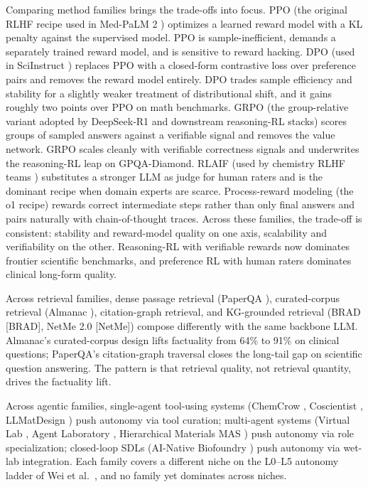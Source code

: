 \documentclass{article}
\begin{document}
Comparing method families brings the trade-offs into focus. PPO (the original RLHF recipe used in Med-PaLM 2 \cite{singhal2025towardexpertlevelm}) optimizes a learned reward model with a KL penalty against the supervised model. PPO is sample-inefficient, demands a separately trained reward model, and is sensitive to reward hacking. DPO (used in SciInstruct \cite{zhang2024sciinstructaselfre}) replaces PPO with a closed-form contrastive loss over preference pairs and removes the reward model entirely. DPO trades sample efficiency and stability for a slightly weaker treatment of distributional shift, and it gains roughly two points over PPO on math benchmarks. GRPO (the group-relative variant adopted by DeepSeek-R1 and downstream reasoning-RL stacks) scores groups of sampled answers against a verifiable signal and removes the value network. GRPO scales cleanly with verifiable correctness signals and underwrites the reasoning-RL leap on GPQA-Diamond. RLAIF (used by chemistry RLHF teams \cite{ramos2024chemicalscience202}) substitutes a stronger LLM as judge for human raters and is the dominant recipe when domain experts are scarce. Process-reward modeling (the o1 recipe) rewards correct intermediate steps rather than only final answers and pairs naturally with chain-of-thought traces. Across these families, the trade-off is consistent: stability and reward-model quality on one axis, scalability and verifiability on the other. Reasoning-RL with verifiable rewards now dominates frontier scientific benchmarks, and preference RL with human raters dominates clinical long-form quality.

Across retrieval families, dense passage retrieval (PaperQA \cite{ala2023arxiv2312075592023}), curated-corpus retrieval (Almanac \cite{zakka2024almanacretrievalau}), citation-graph retrieval, and KG-grounded retrieval (BRAD {[}BRAD{]}, NetMe 2.0 {[}NetMe{]}) compose differently with the same backbone LLM. Almanac's curated-corpus design lifts factuality from 64\% to 91\% on clinical questions; PaperQA's citation-graph traversal closes the long-tail gap on scientific question answering. The pattern is that retrieval quality, not retrieval quantity, drives the factuality lift.

Across agentic families, single-agent tool-using systems (ChemCrow \cite{bran2024naturemachineintel}, Coscientist \cite{boiko2023nature6242023}, LLMatDesign \cite{jia2024arxiv2406131632024}) push autonomy via tool curation; multi-agent systems (Virtual Lab \cite{swanson2024thevirtuallabaiage}, Agent Laboratory \cite{schmidgall2025agentlaboratoryusi}, Hierarchical Materials MAS \cite{rothfarb2025hierarchicalmultia}) push autonomy via role specialization; closed-loop SDLs (AI-Native Biofoundry \cite{zhang2026anainativebiofound}) push autonomy via wet-lab integration. Each family covers a different niche on the L0--L5 autonomy ladder of Wei et al.~\cite{wei2025fromaiforscienceto}, and no family yet dominates across niches.
\end{document}
